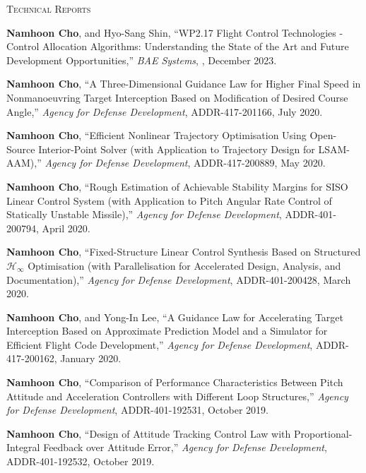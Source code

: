\textsc{Technical Reports}
\vspace{0.5em}
\begin{enumerate}[itemsep=0.5em, label={[}TR\arabic*{]}]
\item \textbf{Namhoon Cho}, and Hyo-Sang Shin, ``WP2.17 Flight Control Technologies - Control Allocation Algorithms: Understanding the State of the Art and Future Development Opportunities,'' \textit{BAE Systems}, , December 2023.

\item \textbf{Namhoon Cho}, ``A Three-Dimensional Guidance Law for Higher Final Speed in Nonmanoeuvring Target Interception Based on Modification of Desired Course Angle,'' \textit{Agency for Defense Development}, ADDR-417-201166, July 2020.

\item \textbf{Namhoon Cho}, ``Efficient Nonlinear Trajectory Optimisation Using Open-Source Interior-Point Solver (with Application to Trajectory Design for LSAM-AAM),'' \textit{Agency for Defense Development}, ADDR-417-200889, May 2020.

\item \textbf{Namhoon Cho}, ``Rough Estimation of Achievable Stability Margins for SISO Linear Control System (with Application to Pitch Angular Rate Control of Statically Unstable Missile),'' \textit{Agency for Defense Development}, ADDR-401-200794, April 2020.

\item \textbf{Namhoon Cho}, ``Fixed-Structure Linear Control Synthesis Based on Structured $\mathcal{H}_{\infty}$ Optimisation (with Parallelisation for Accelerated Design, Analysis, and Documentation),'' \textit{Agency for Defense Development}, ADDR-401-200428, March 2020.

\item \textbf{Namhoon Cho}, and Yong-In Lee, ``A Guidance Law for Accelerating Target Interception Based on Approximate Prediction Model and a Simulator for Efficient Flight Code Development,'' \textit{Agency for Defense Development}, ADDR-417-200162, January 2020.

\item \textbf{Namhoon Cho}, ``Comparison of Performance Characteristics Between Pitch Attitude and Acceleration Controllers with Different Loop Structures,'' \textit{Agency for Defense Development}, ADDR-401-192531, October 2019.

\item \textbf{Namhoon Cho}, ``Design of Attitude Tracking Control Law with Proportional-Integral Feedback over Attitude Error,'' \textit{Agency for Defense Development}, ADDR-401-192532, October 2019.

\end{enumerate}
\vspace{0.5em}

